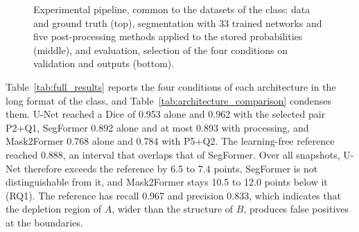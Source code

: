 \documentclass[final,5p,times,twocolumn]{elsarticle}
\begin{document}
\begin{figure}[t]
{}
\caption{Experimental pipeline, common to the datasets of the class: data and ground truth (top), segmentation with 33 trained networks and five post-processing methods applied to the stored probabilities (middle), and evaluation, selection of the four conditions on validation and outputs (bottom).}
\label{fig:overview}
\end{figure}

Table~\ref{tab:full_results} reports the four conditions of each architecture in the long format of the class, and Table~\ref{tab:architecture_comparison} condenses them. U-Net reached a Dice of 0.953 alone and 0.962 with the selected pair P2+Q1, SegFormer 0.892 alone and at most 0.893 with processing, and Mask2Former 0.768 alone and 0.784 with P5+Q2. The learning-free reference reached 0.888, an interval that overlaps that of SegFormer. Over all snapshots, U-Net therefore exceeds the reference by 6.5 to 7.4 points, SegFormer is not distinguishable from it, and Mask2Former stays 10.5 to 12.0 points below it (RQ1). The reference has recall 0.967 and precision 0.833, which indicates that the depletion region of $A$, wider than the structure of $B$, produces false positives at the boundaries.



\end{document}
